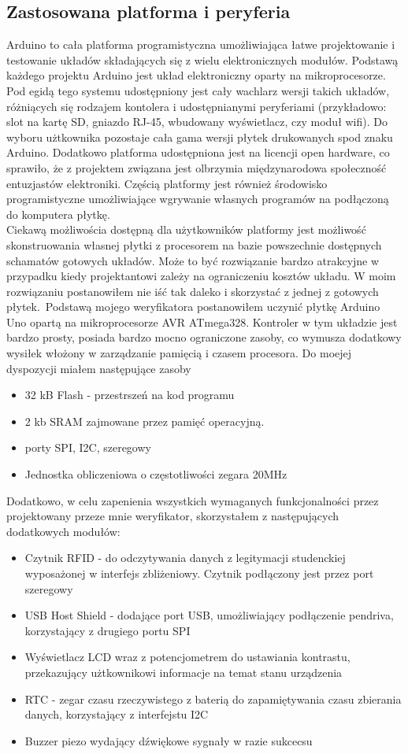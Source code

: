 \documentclass[declaration,shortabstract, mgr]{iithesis}
\begin{document}
\subsection{Zastosowana platforma i peryferia}
\indent Arduino to cała platforma programistyczna umożliwiająca łatwe projektowanie i testowanie układów składających się z wielu elektronicznych modułów. Podstawą każdego projektu Arduino jest układ elektroniczny oparty na mikroprocesorze. Pod egidą tego systemu udostępniony jest cały wachlarz wersji takich układów, różniących się rodzajem kontolera i udostępnianymi peryferiami (przykładowo: slot na kartę SD, gniazdo RJ-45, wbudowany wyświetlacz, czy moduł wifi). Do wyboru użtkownika pozostaje cała gama wersji płytek drukowanych spod znaku Arduino. Dodatkowo platforma udostępniona jest na licencji open hardware, co sprawiło, że z projektem związana jest olbrzymia międzynarodowa społeczność entuzjastów elektroniki. Częścią platformy jest również środowisko programistyczne umożliwiające wgrywanie własnych programów na podłączoną do komputera płytkę.\\
\indent Ciekawą możliwościa dostępną dla użytkowników platformy jest możliwość skonstruowania własnej płytki z procesorem na bazie powszechnie dostępnych schamatów gotowych układów. Może to być rozwiązanie bardzo atrakcyjne w przypadku kiedy projektantowi zależy na ograniczeniu kosztów układu. W moim rozwiązaniu postanowiłem nie iść tak daleko i skorzystać z jednej z gotowych płytek.\
\indent Podstawą mojego weryfikatora postanowiłem uczynić płytkę Arduino Uno opartą na mikroprocesorze AVR ATmega328. Kontroler w tym układzie jest bardzo prosty, posiada bardzo mocno ograniczone zasoby, co wymusza dodatkowy wysiłek włożony w zarządzanie pamięcią i czasem procesora. Do moejej dyspozycji miałem następujące zasoby\\
\begin{itemize}
\item 32 kB Flash - przestrszeń na kod programu
\item 2 kb SRAM zajmowane przez pamięć operacyjną.
\item  porty SPI, I2C, szeregowy
\item Jednostka obliczeniowa o częstotliwości zegara 20MHz
\end{itemize}
\indent Dodatkowo, w celu zapenienia wszystkich wymaganych funkcjonalności przez projektowany przeze mnie weryfikator, skorzystałem z następujących dodatkowych modułów:
\begin{itemize}
\item Czytnik RFID - do odczytywania danych z legitymacji studenckiej wyposażonej w interfejs zbliżeniowy. Czytnik podłączony jest przez port szeregowy
\item USB Host Shield - dodające port USB, umożliwiający podłączenie pendriva, korzystający z drugiego portu SPI
\item Wyświetlacz LCD wraz z  potencjometrem do ustawiania kontrastu, przekazujący użtkownikowi informacje na temat stanu urządzenia
\item RTC - zegar czasu rzeczywistego z baterią do zapamiętywania czasu zbierania danych, korzystający z interfejstu I2C
\item Buzzer piezo wydający dźwiękowe sygnały w razie sukcecsu
\end{itemize}
\end{document}
